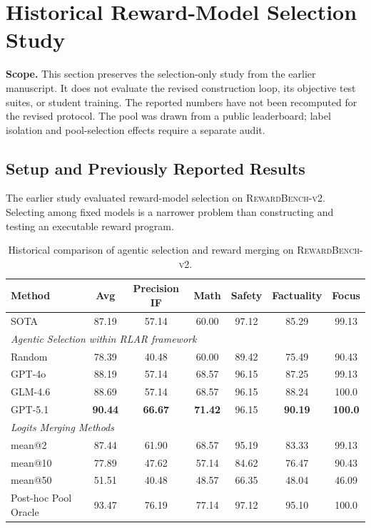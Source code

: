 \section{Historical Reward-Model Selection Study}\label{apd:legacy_routing}

\noindent\textbf{Scope.} This section preserves the selection-only study from the earlier manuscript. It does not evaluate the revised construction loop, its objective test suites, or student training. The reported numbers have not been recomputed for the revised protocol. The pool was drawn from a public leaderboard; label isolation and pool-selection effects require a separate audit.

\subsection{Setup and Previously Reported Results}


The earlier study evaluated reward-model selection on \textsc{RewardBench-v2}. Selecting among fixed models is a narrower problem than constructing and testing an executable reward program.

\begin{table}[h]
    \centering
    \caption{Historical comparison of agentic selection and reward merging on \textsc{RewardBench-v2}.}
    \label{tab:rewardbench_results}
    \small
    \begin{tabular}{lcccccc}
    \toprule
    \textbf{Method} & \textbf{Avg} & \textbf{Precision IF} & \textbf{Math} & \textbf{Safety} & \textbf{Factuality} & \textbf{Focus} \\
    \midrule
    SOTA        & 87.19 & 57.14 & 60.00 & 97.12 & 85.29 & 99.13 \\  \midrule
    \multicolumn{7}{l}{\textit {Agentic Selection within RLAR framework }} \\ 
    Random           & 78.39 & 40.48 & 60.00 & 89.42 & 75.49 & 90.43 \\
    GPT-4o    & 88.19 & 57.14 & 68.57 & 96.15 & 87.25 & 99.13 \\
    GLM-4.6   & 88.69 & 57.14 & 68.57 & 96.15 & 88.24 & 100.0 \\
    GPT-5.1          & \textbf{90.44} & \textbf{66.67} & \textbf{71.42} & 96.15 & \textbf{90.19} & \textbf{100.0} \\
    \midrule
    \multicolumn{7}{l}{\textit{Logits Merging Methods }} \\ 
    mean@2           & 87.44 & 61.90 & 68.57 & 95.19 & 83.33 & 99.13 \\
    mean@10          & 77.89 & 47.62 & 57.14 & 84.62 & 76.47 & 90.43 \\
    mean@50          & 51.51 & 40.48 & 48.57 & 66.35 & 48.04 & 46.09 \\
    \midrule
    Post-hoc Pool Oracle & 93.47 & 76.19 & 77.14 & 97.12 & 95.10 & 100.0 \\
    \bottomrule
    \end{tabular}
\end{table}


